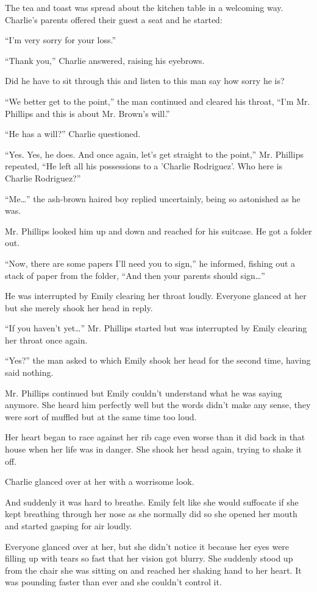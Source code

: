 The tea and toast was spread about the kitchen table in a welcoming way. Charlie's parents offered their guest a seat and he started:

“I'm very sorry for your loss.”

“Thank you,” Charlie answered, raising his eyebrows.

Did he have to sit through this and listen to this man say how sorry he is?

“We better get to the point,” the man continued and cleared his throat, “I'm Mr. Phillips and this is about Mr. Brown's will.”

“He has a will?” Charlie questioned.

“Yes. Yes, he does. And once again, let's get straight to the point,” Mr. Phillips repeated, “He left all his possessions to a 'Charlie Rodriguez'. Who here is Charlie Rodriguez?”

“Me…” the ash-brown haired boy replied uncertainly, being so astonished as he was.

Mr. Phillips looked him up and down and reached for his suitcase. He got a folder out.

“Now, there are some papers I'll need you to sign,” he informed, fishing out a stack of paper from the folder, “And then your parents should sign…”

He was interrupted by Emily clearing her throat loudly. Everyone glanced at her but she merely shook her head in reply.

“If you haven't yet…” Mr. Phillips started but was interrupted by Emily clearing her throat once again.

“Yes?” the man asked to which Emily shook her head for the second time, having said nothing.

Mr. Phillips continued but Emily couldn't understand what he was saying anymore. She heard him perfectly well but the words didn't make any sense, they were sort of muffled but at the same time too loud.

Her heart began to race against her rib cage even worse than it did back in that house when her life was in danger. She shook her head again, trying to shake it off.

Charlie glanced over at her with a worrisome look.

And suddenly it was hard to breathe. Emily felt like she would suffocate if she kept breathing through her nose as she normally did so she opened her mouth and started gasping for air loudly.

Everyone glanced over at her, but she didn't notice it because her eyes were filling up with tears so fast that her vision got blurry. She suddenly stood up from the chair she was sitting on and reached her shaking hand to her heart. It was pounding faster than ever and she couldn't control it.

